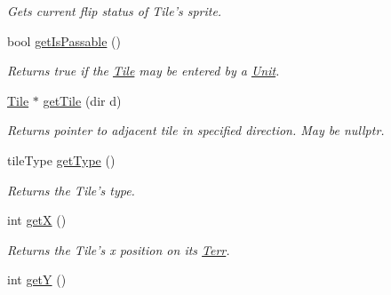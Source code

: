 \begin{DoxyCompactItemize}
\begin{DoxyCompactList}\small\item\em Gets current flip status of Tile’s sprite. \end{DoxyCompactList}\item 
bool \hyperlink{class_tile_aaddc2d065a537489c31de4a566bb0bd5}{get\+Is\+Passable} ()\hypertarget{class_tile_aaddc2d065a537489c31de4a566bb0bd5}{}\label{class_tile_aaddc2d065a537489c31de4a566bb0bd5}

\begin{DoxyCompactList}\small\item\em Returns true if the \hyperlink{class_tile}{Tile} may be entered by a \hyperlink{class_unit}{Unit}. \end{DoxyCompactList}\item 
\hyperlink{class_tile}{Tile} $\ast$ \hyperlink{class_tile_ae5038e62f2a4c28150f6abb4deb31433}{get\+Tile} (dir d)\hypertarget{class_tile_ae5038e62f2a4c28150f6abb4deb31433}{}\label{class_tile_ae5038e62f2a4c28150f6abb4deb31433}

\begin{DoxyCompactList}\small\item\em Returns pointer to adjacent tile in specified direction. May be nullptr. \end{DoxyCompactList}\item 
tile\+Type \hyperlink{class_tile_a36871de25627c7483c31807da1c28706}{get\+Type} ()\hypertarget{class_tile_a36871de25627c7483c31807da1c28706}{}\label{class_tile_a36871de25627c7483c31807da1c28706}

\begin{DoxyCompactList}\small\item\em Returns the Tile’s type. \end{DoxyCompactList}\item 
int \hyperlink{class_tile_a25b90e07fd9cdaba1df3ac2a9b6d032b}{getX} ()\hypertarget{class_tile_a25b90e07fd9cdaba1df3ac2a9b6d032b}{}\label{class_tile_a25b90e07fd9cdaba1df3ac2a9b6d032b}

\begin{DoxyCompactList}\small\item\em Returns the Tile’s x position on its \hyperlink{class_terr}{Terr}. \end{DoxyCompactList}\item 
int \hyperlink{class_tile_acf97bff4aac74cc8d7e09bc8ca5afa68}{getY} ()\hypertarget{class_tile_acf97bff4aac74cc8d7e09bc8ca5afa68}{}\label{class_tile_acf97bff4aac74cc8d7e09bc8ca5afa68}


\end{DoxyCompactItemize}
